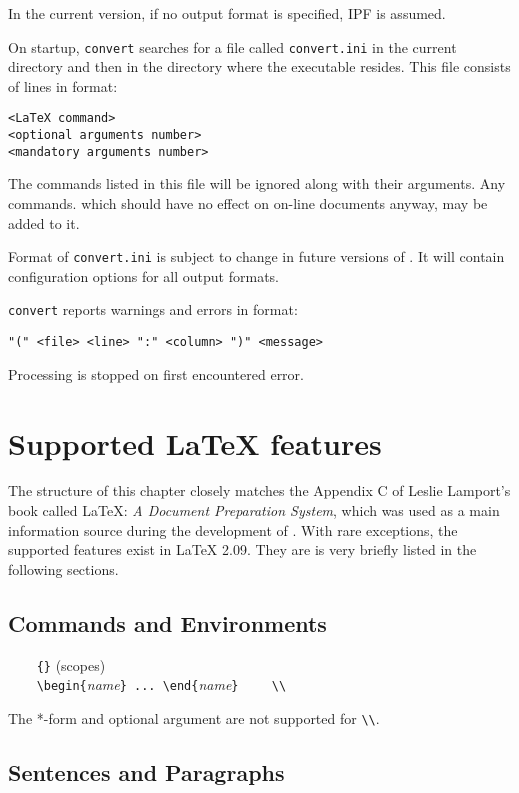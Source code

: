 In the current version, if no output format is specified, IPF is assumed.

On startup, \verb'convert' searches for a file called \verb'convert.ini'
in the current directory and then in the directory where the executable
resides. This file consists of lines in format:

\verb'<LaTeX command>'              \\
\verb'<optional arguments number>'  \\
\verb'<mandatory arguments number>'

The commands listed in this file will be ignored along with their arguments.
Any commands. which should have no effect on on-line documents anyway,
may be added to it.

Format of \verb'convert.ini' is subject to change in future versions of
\LO. It will contain configuration options for all output formats.

\verb'convert' reports warnings and errors in format:

\verb'"(" <file> <line> ":" <column> ")" <message>'

Processing is stopped on first encountered error.

\chapter{Supported LaTeX features}

The structure of this chapter closely matches the Appendix C of Leslie
Lamport's book called \LaTeX: {\em A Document Preparation System}, which
was used as a main information source during the development of \LO.
With rare exceptions, the supported features exist in \LaTeX{} 2.09.
They are is very briefly listed in the following sections.

\section{Commands and Environments}

\verb'    {}' (scopes) \\
\verb'    \begin{'{\it name}\verb'} ... \end{'{\it name}\verb'}'
\verb'    \\'

The *-form and optional argument are not supported for \verb'\\'.

\section{Sentences and Paragraphs}

